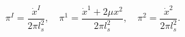 \begin{equation}
\pi^I = \frac{\dot{x}^I}{2 \pi l_s^2}, \quad
\pi^1 = \frac{\dot{x}^1 + 2 \mu x^2}{2 \pi l_s^2}, \quad
\pi^2 = \frac{\dot{x}^2}{2 \pi l_s^2}.
\end{equation}


